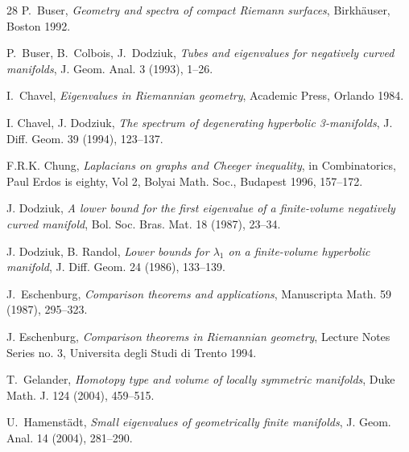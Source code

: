 \documentclass[11pt]{amsart}
\theoremstyle{plain}
\theoremstyle{plain}
\theoremstyle{definition}
\begin{document}
\begin{thebibliography}{28}
 P.~Buser, {\em Geometry and spectra
of compact Riemann surfaces}, Birkh\"auser, Boston 1992.



 P.~Buser, B.~Colbois, J.~Dodziuk,
{\em Tubes and eigenvalues for negatively curved manifolds},
J. Geom. Anal. 3 (1993), 1--26.  


 I.~Chavel, {\em Eigenvalues in Riemannian geometry}, 
Academic Press, Orlando 1984.  

 I. Chavel, J. Dodziuk, 
{\em The spectrum of degenerating hyperbolic 3-manifolds}, 
J. Diff. Geom. 39 (1994), 123--137. 


 F.R.K. Chung, {\em Laplacians on graphs and Cheeger inequality}, 
in Combinatorics, Paul Erdos is eighty, Vol 2, Bolyai Math. Soc., Budapest 1996, 157--172.



 J. Dodziuk, {\em A lower bound for the first eigenvalue of a finite-volume
negatively curved manifold}, Bol. Soc. Bras. Mat. 18 (1987), 23--34.

 J. Dodziuk, B. Randol, {\em Lower bounds for $\lambda_1$ on a finite-volume hyperbolic 
manifold}, J. Diff. Geom. 24 (1986), 133--139.


 J.~Eschenburg, {\em Comparison theorems and
applications}, Manuscripta Math. 59 (1987), 295--323.

 J. Eschenburg, {\em Comparison theorems in Riemannian geometry}, 
Lecture Notes Series no. 3, Universita degli Studi di Trento 1994. 



 T.~Gelander, {\em Homotopy
type and volume of locally symmetric manifolds},
Duke Math. J. 124 (2004), 459--515.


 U.~Hamenst\"adt, {\em Small eigenvalues of 
geometrically finite manifolds}, J. Geom. Anal. 14 (2004), 281--290. 





\end{thebibliography}
\end{document}
